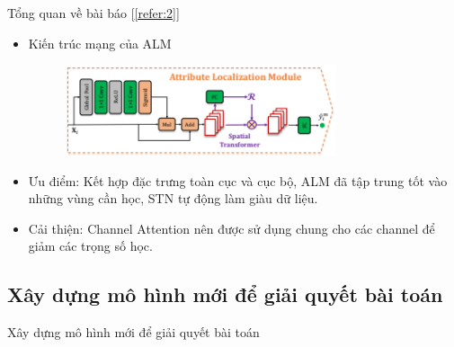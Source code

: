 \begin{frame}{Tổng quan về bài báo [\ref{refer:2}]}
\begin{itemize}
    \item Kiến trúc mạng của ALM
    \begin{figure}[H]
    \centering
    \includegraphics[width=8cm]{images/ALM.png}
    \label{fig:ALM}
    \end{figure}
    \item Ưu điểm: Kết hợp đặc trưng toàn cục và cục bộ, ALM đã tập trung tốt vào những vùng cần học, STN tự động làm giàu dữ liệu.
    \item Cải thiện: Channel Attention nên được sử dụng chung cho các channel để giảm các trọng số học.
\end{itemize}
\end{frame}

\subsection{Xây dựng mô hình mới để giải quyết bài toán}
\begin{frame}{Xây dựng mô hình mới để giải quyết bài toán}
\end{frame}
